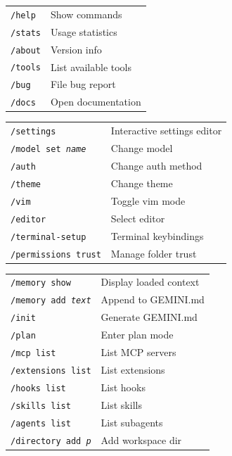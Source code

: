 \documentclass[9pt]{extarticle}
\newcommand{\sect}[1]{\needspace{4\baselineskip}\vspace{6pt}{\footnotesize\bfseries\scshape #1}\par\vspace{2pt}}
\begin{document}
\begin{multicols}{3}
\sect{Slash Commands --- Info}
\begin{tabularx}{\linewidth}{@{}l@{\enspace}Y@{}}
\texttt{/help}                       & Show commands \\
\texttt{/stats}                      & Usage statistics \\
\texttt{/about}                      & Version info \\
\texttt{/tools}                      & List available tools \\
\texttt{/bug}                        & File bug report \\
\texttt{/docs}                       & Open documentation \\
\end{tabularx}

\sect{Slash Commands --- Config}
\begin{tabularx}{\linewidth}{@{}l@{\enspace}Y@{}}
\texttt{/settings}                   & Interactive settings editor \\
\texttt{/model set \textit{name}}   & Change model \\
\texttt{/auth}                       & Change auth method \\
\texttt{/theme}                      & Change theme \\
\texttt{/vim}                        & Toggle vim mode \\
\texttt{/editor}                     & Select editor \\
\texttt{/terminal-setup}            & Terminal keybindings \\
\texttt{/permissions trust}         & Manage folder trust \\
\end{tabularx}

\sect{Slash Commands --- Tools}
\begin{tabularx}{\linewidth}{@{}l@{\enspace}Y@{}}
\texttt{/memory show}               & Display loaded context \\
\texttt{/memory add \textit{text}}  & Append to GEMINI.md \\
\texttt{/init}                       & Generate GEMINI.md \\
\texttt{/plan}                       & Enter plan mode \\
\texttt{/mcp list}                   & List MCP servers \\
\texttt{/extensions list}           & List extensions \\
\texttt{/hooks list}                 & List hooks \\
\texttt{/skills list}               & List skills \\
\texttt{/agents list}               & List subagents \\
\texttt{/directory add \textit{p}} & Add workspace dir \\
\end{tabularx}


\end{multicols}
\end{document}

